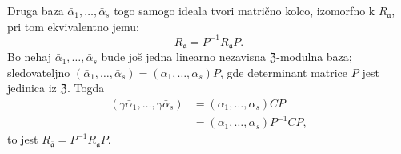 \documentclass[11pt]{article}
\begin{document}
\setcounter{footnote}{24}

Druga baza $\bar\alpha_1,\ldots,\bar\alpha_s$ togo samogo ideala tvori matrično kolco, izomorfno k $R_{\mathfrak a}$, pri tom ekvivalentno jemu:
\[
        R_{\bar{\mathfrak a}}=P^{-1}R_{\mathfrak a}P.
\]
Bo nehaj $\bar\alpha_1,\ldots,\bar\alpha_s$ bude još jedna linearno nezavisna $\mathfrak Z$-modulna baza; sledovateljno $(\bar\alpha_1,\ldots,\bar\alpha_s)=(\alpha_1,\ldots,\alpha_s)P$, gde determinant matrice $P$ jest jedinica iz $\mathfrak Z$. Togda
\[
\begin{aligned}
(\gamma\bar\alpha_1,\ldots,\gamma\bar\alpha_s)
&=(\alpha_1,\ldots,\alpha_s)CP\\
&=(\bar\alpha_1,\ldots,\bar\alpha_s)P^{-1}CP,
\end{aligned}
\]
to jest $R_{\bar{\mathfrak a}}=P^{-1}R_{\mathfrak a}P$.
\end{document}
